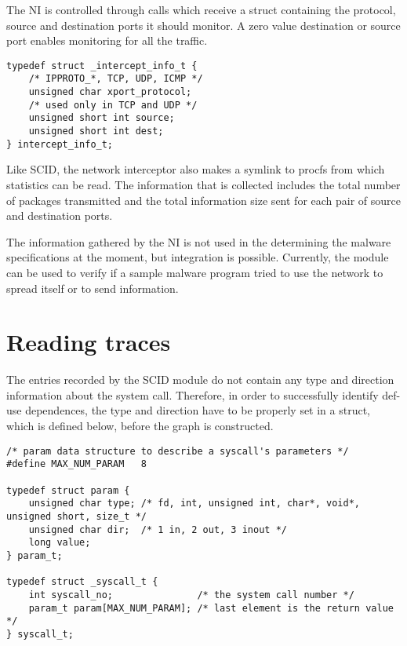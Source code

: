 The NI is controlled through  calls which receive a  struct containing the protocol, source and destination ports it should monitor. A zero value destination or source port enables monitoring for all the traffic.

\lstset{language=C,caption=parameter data structures,label=lst:param-struct}
\begin{lstlisting}
typedef struct _intercept_info_t {
	/* IPPROTO_*, TCP, UDP, ICMP */
	unsigned char xport_protocol;
	/* used only in TCP and UDP */
	unsigned short int source;
	unsigned short int dest;
} intercept_info_t;
\end{lstlisting}

Like SCID, the network interceptor also makes a symlink to procfs from which statistics can be read. The information that is collected includes the total number of packages transmitted and the total information size sent for each pair of source and destination ports.

The information gathered by the NI is not used in the determining the malware specifications at the moment, but integration is possible. Currently, the module can be used to verify if a sample malware program tried to use the network to spread itself or to send information.

\section{Reading traces}
\label{fourth:read-traces}

The entries recorded by the SCID module do not contain any type and direction information about the system call. Therefore, in order to successfully identify def-use dependences, the type and direction have to be properly set in a  struct, which is defined below, before the graph is constructed.

\lstset{language=C,caption=Parameter data structures,label=lst:param-struct}
\begin{lstlisting}
/* param data structure to describe a syscall's parameters */
#define MAX_NUM_PARAM	8

typedef struct param {
	unsigned char type; /* fd, int, unsigned int, char*, void*, unsigned short, size_t */
	unsigned char dir;  /* 1 in, 2 out, 3 inout */
	long value;
} param_t;

typedef struct _syscall_t {
	int syscall_no;               /* the system call number */
	param_t param[MAX_NUM_PARAM]; /* last element is the return value */
} syscall_t;
\end{lstlisting}

